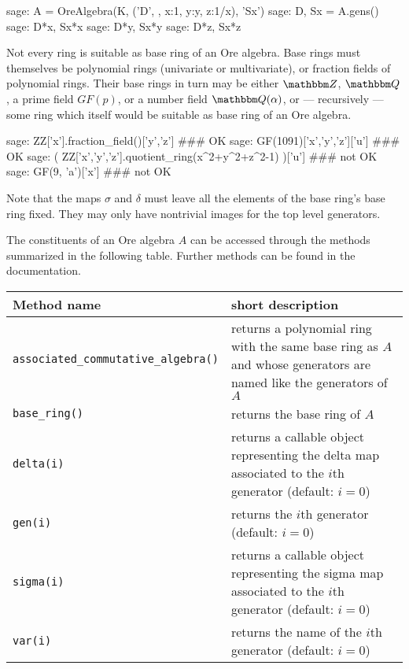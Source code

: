 \documentclass[11pt]{amsart}
\let\set\mathbbm
\begin{document}
\begin{sageexample}
  sage: A = OreAlgebra(K, ('D', {}, {x:1, y:y, z:1/x}), 'Sx')
  sage: D, Sx = A.gens()
  sage: D*x, Sx*x
  sage: D*y, Sx*y
  sage: D*z, Sx*z
\end{sageexample}

Not every ring is suitable as base ring of an Ore algebra. Base rings must
themselves be polynomial rings (univariate or multivariate), or fraction 
fields of polynomial rings. Their base rings in turn may be either $\set Z$,
$\set Q$, a prime field $GF(p)$, or a number field $\set Q(\alpha)$, or
--- recursively --- some ring which itself would be suitable as base ring
of an Ore algebra. 

\begin{sageexample}
  sage: ZZ['x'].fraction_field()['y','z'] ### OK
  sage: GF(1091)['x','y','z']['u'] ### OK
  sage: ( ZZ['x','y','z'].quotient_ring(x^2+y^2+z^2-1) )['u'] ### not OK
  sage: GF(9, 'a')['x'] ### not OK
\end{sageexample}

Note that the maps $\sigma$ and $\delta$ must leave all the elements of
the base ring's base ring fixed. They may only have nontrivial images for
the top level generators. 

The constituents of an Ore algebra $A$ can be accessed through the methods
summarized in the following table. Further methods can be found in the 
documentation. 

\begin{center}
  \begin{tabular}{|l|p{.5\hsize}|}
    \hline
    Method name & short description \\\hline
    \verb|associated_commutative_algebra()| & returns a polynomial ring with the
       same base ring as $A$ and whose generators are named like the generators
       of~$A$\\
    \verb|base_ring()| & returns the base ring of $A$\\
    \verb|delta(i)| & returns a callable object representing the delta map
       associated to the $i$th generator (default: $i=0$) \\
    \verb|gen(i)| & returns the $i$th generator (default: $i=0$)\\
    \verb|sigma(i)| & returns a callable object representing the sigma map
       associated to the $i$th generator (default: $i=0$) \\
    \verb|var(i)| & returns the name of the $i$th generator (default: $i=0$)\\\hline
  \end{tabular}
\end{center}
\end{document}
